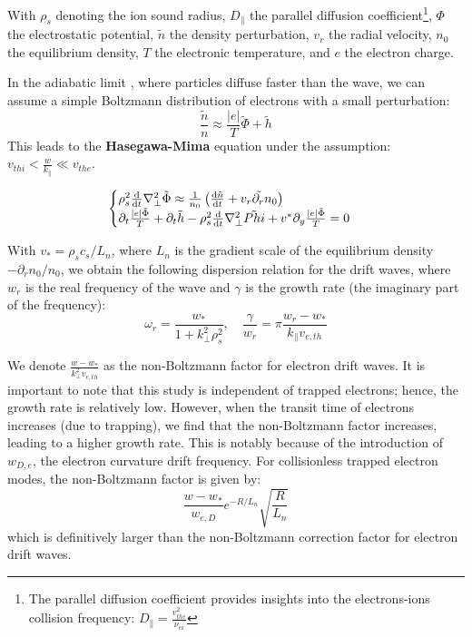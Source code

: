 \documentclass[11pt,openany]{report}
\begin{document}
\begin{multicols}{2}
    With $\rho_s$ denoting the ion sound radius, $D_\parallel$ the parallel diffusion coefficient\footnote{The parallel diffusion coefficient provides insights into the electrons-ions collision frequency: $D_\parallel = \frac{v_{the}^2}{\nu_{ei}}$}, $\Phi$ the electrostatic potential, $\tilde{n}$ the density perturbation, $v_r$ the radial velocity, $n_0$ the equilibrium density, $T$ the electronic temperature, and $e$ the electron charge.

    In the adiabatic limit \cite{Trapped_Particle_Mode}, where particles diffuse faster than the wave, we can assume a simple Boltzmann distribution of electrons with a small perturbation:
    $$\frac{\tilde{n}}{n} \approx \frac{\vert e \vert}{T} \tilde{\Phi} + \tilde{h}$$
    This leads to the \textbf{Hasegawa-Mima} \cite{Mima} equation under the assumption: $v_{thi} < \frac{w}{k_\parallel} \ll v_{the}$.

    \begin{equation}
        \begin{cases}
            \rho_s^2\dv{t}\nabla_\perp^2\tilde{\Phi} \approx \frac{1}{n_0}\left(\dv{\tilde{n}}{t} + \tilde{v_r\partial_r n_0}\right) \\
            \partial_t \frac{\vert e \vert \tilde{\Phi}}{T} + \partial_t \tilde{h} - \rho_s^2\dv{t}\nabla_\perp^2\tilde{Phi}  + v^{*}\partial_y\frac{\vert e \vert \tilde{\Phi}}{T} = 0
        \end{cases}
    \end{equation}

    With $v_* = \rho_s c_s / L_n$, where $L_n$ is the gradient scale of the equilibrium density $-\partial_r n_0 / n_0$, we obtain the following dispersion relation for the drift waves, where $w_r$ is the real frequency of the wave and $\gamma$ is the growth rate (the imaginary part of the frequency):
    $$\omega_r = \frac{w_{*}}{1 + k_\perp^2 \rho_s^2}, \quad \frac{\gamma}{w_r} = \pi \frac{w_r - w_{*}}{k_\parallel v_{e,th}}$$

    We denote $\frac{w - w_*}{k_\perp^2 v_{e,th}}$ as the non-Boltzmann factor for electron drift waves. It is important to note that this study is independent of trapped electrons; hence, the growth rate is relatively low. However, when the transit time of electrons increases (due to trapping), we find \cite{San_diego} that the non-Boltzmann factor increases, leading to a higher growth rate. This is notably because of the introduction of $w_{D,e}$, the electron curvature drift frequency. For collisionless trapped electron modes, the non-Boltzmann factor is given by:
    $$\frac{w - w_*}{w_{e,D}} e^{-R/L_n} \sqrt{\frac{R}{L_n}}$$
    which is definitively larger than the non-Boltzmann correction factor for electron drift waves.


\end{multicols}
\end{document}

